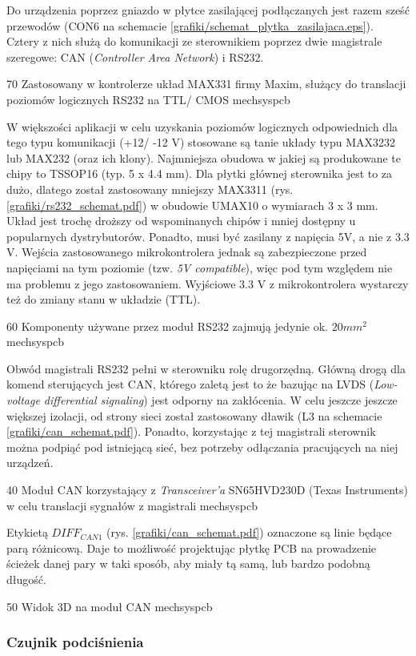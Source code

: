 Do urządzenia poprzez gniazdo w płytce zasilającej podłączanych jest razem sześć przewodów (CON6 na schemacie \ref{grafiki/schemat_plytka_zasilajaca.eps}). Cztery z nich służą do komunikacji ze sterownikiem poprzez dwie magistrale szeregowe: CAN ({\it Controller Area Network}) i RS232.

	{70}
	{Zastosowany w kontrolerze układ MAX331 firmy Maxim, służący do translacji poziomów logicznych RS232 na TTL/ CMOS}
	{mechsyspcb}

W większości aplikacji w celu uzyskania poziomów logicznych odpowiednich dla tego typu komunikacji (+12/ -12 V) stosowane są tanie układy typu MAX3232 lub MAX232 (oraz ich klony). Najmniejsza obudowa w jakiej są produkowane te chipy to TSSOP16 (typ. 5 x 4.4 mm). Dla płytki głównej sterownika jest to za dużo, dlatego został zastosowany mniejszy   MAX3311 (rys. \ref{grafiki/rs232_schemat.pdf}) w obudowie UMAX10 o wymiarach 3 x 3 mm. Układ jest trochę droższy od wspominanych chipów i mniej dostępny u popularnych dystrybutorów. Ponadto, musi być zasilany z napięcia 5V, a nie z 3.3 V. Wejścia zastosowanego mikrokontrolera jednak są zabezpieczone przed napięciami na tym poziomie (tzw. {\it 5V compatible}), więc pod tym względem nie ma problemu z jego zastosowaniem. Wyjściowe 3.3 V z mikrokontrolera wystarczy też do zmiany stanu w układzie (TTL).

	{60}
	{Komponenty używane przez moduł RS232 zajmują jedynie ok. $ 20 mm^2 $}
	{mechsyspcb}

Obwód magistrali RS232 pełni w sterowniku rolę drugorzędną. Główną drogą dla komend sterujących jest CAN, którego zaletą jest to że bazując na LVDS ({\it Low-voltage differential signaling}) jest odporny na zakłócenia. W celu jeszcze jeszcze większej izolacji, od strony sieci został zastosowany dławik (L3 na schemacie \ref{grafiki/can_schemat.pdf}). Ponadto, korzystając z tej magistrali sterownik można podpiąć pod istniejącą sieć, bez potrzeby odłączania pracujących na niej urządzeń.

	{40}
	{Moduł CAN korzystający z {\it Transceiver'a} SN65HVD230D (Texas Instruments) w celu translacji sygnałów z magistrali}
	{mechsyspcb}
	
Etykietą $ DIFF_{CAN1} $ (rys. \ref{grafiki/can_schemat.pdf}) oznaczone są linie będące parą różnicową. Daje to możliwość projektując płytkę PCB na prowadzenie ścieżek danej pary w taki sposób, aby miały tą samą, lub bardzo podobną długość.

	{50}
	{Widok 3D na moduł CAN}
	{mechsyspcb}
	
\subsubsection{Czujnik podciśnienia}


\clearpage














